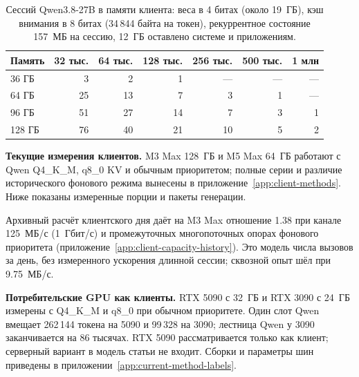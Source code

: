 \begin{table}[t]
\centering
\caption{Сессий Qwen3.8-27B в памяти клиента: веса в 4 битах (около 19~ГБ), кэш внимания в 8 битах (34\,844 байта на
токен), рекуррентное состояние 157~МБ на сессию, 12~ГБ оставлено системе и приложениям.}
\label{tab:fit}
\footnotesize
\begin{tabular}{lrrrrrr}
\toprule
Память & 32 тыс. & 64 тыс. & 128 тыс. & 256 тыс. & 500 тыс. & 1 млн \\
\midrule
36 ГБ & 3 & 2 & 1 & --- & --- & --- \\
64 ГБ & 25 & 13 & 7 & 3 & 1 & --- \\
96 ГБ & 51 & 27 & 14 & 7 & 3 & 1 \\
128 ГБ & 76 & 40 & 21 & 10 & 5 & 2 \\
\bottomrule
\end{tabular}
\end{table}

\textbf{Текущие измерения клиентов.} M3 Max 128~ГБ и M5 Max 64~ГБ работают с Qwen Q4\_K\_M,
q8\_0 KV и обычным приоритетом; полные серии и различие исторического фонового режима вынесены
в приложение~\ref{app:client-methods}. Ниже показаны измеренные порции и пакеты генерации.

Архивный расчёт клиентского дня даёт на M3 Max отношение 1.38 при канале 125~МБ/с (1~Гбит/с)
и промежуточных многопоточных опорах фонового приоритета (приложение~\ref{app:client-capacity-history}).
Это модель числа вызовов за день, без измеренного ускорения длинной сессии; сквозной опыт шёл при 9.75~МБ/с.

\textbf{Потребительские GPU как клиенты.} RTX 5090 с 32~ГБ и RTX 3090 с 24~ГБ измерены
с Q4\_K\_M и q8\_0 при обычном приоритете. Один слот Qwen вмещает 262\,144 токена на 5090
и 99\,328 на 3090; лестница Qwen у 3090 заканчивается на 86 тысячах.
RTX 5090 рассматривается только как клиент; серверный вариант в модель статьи не входит. Сборки и параметры шин приведены в приложении~\ref{app:current-method-labels}.

